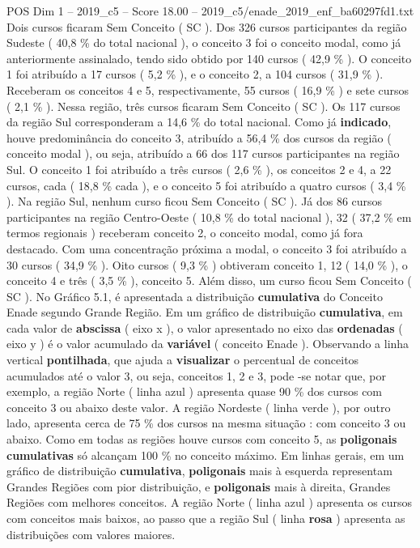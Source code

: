 \begin{textsample}{POS Dim 1 – 2019\_c5 – Score 18.00 – 2019\_c5/enade\_2019\_enf\_ba60297fd1.txt}
Dois cursos ficaram Sem Conceito ( SC ).
Dos 326 cursos participantes da região Sudeste ( 40,8 \% do total nacional ), o conceito 3 foi o conceito modal, como já anteriormente assinalado, tendo sido obtido por 140 cursos ( 42,9 \% ).
O conceito 1 foi atribuído a 17 cursos ( 5,2 \% ), e o conceito 2, a 104 cursos ( 31,9 \% ).
Receberam os conceitos 4 e 5, respectivamente, 55 cursos ( 16,9 \% ) e sete cursos ( 2,1 \% ).
Nessa região, três cursos ficaram Sem Conceito ( SC ).
Os 117 cursos da região Sul corresponderam a 14,6 \% do total nacional.
Como já \textbf{indicado}, houve predominância do conceito 3, atribuído a 56,4 \% dos cursos da região ( conceito modal ), ou seja, atribuído a 66 dos 117 cursos participantes na região Sul.
O conceito 1 foi atribuído a três cursos ( 2,6 \% ), os conceitos 2 e 4, a 22 cursos, cada ( 18,8 \% cada ), e o conceito 5 foi atribuído a quatro cursos ( 3,4 \% ).
Na região Sul, nenhum curso ficou Sem Conceito ( SC ).
Já dos 86 cursos participantes na região Centro-Oeste ( 10,8 \% do total nacional ), 32 ( 37,2 \% em termos regionais ) receberam conceito 2, o conceito modal, como já fora destacado.
Com uma concentração próxima a modal, o conceito 3 foi atribuído a 30 cursos ( 34,9 \% ).
Oito cursos ( 9,3 \% ) obtiveram conceito 1, 12 ( 14,0 \% ), o conceito 4 e três ( 3,5 \% ), conceito 5.
Além disso, um curso ficou Sem Conceito ( SC ).
No Gráfico 5.1, é apresentada a distribuição \textbf{cumulativa} do Conceito Enade segundo Grande Região.
Em um gráfico de distribuição \textbf{cumulativa}, em cada valor de \textbf{abscissa} ( eixo x ), o valor apresentado no eixo das \textbf{ordenadas} ( eixo y ) é o valor acumulado da \textbf{variável} ( conceito Enade ).
Observando a linha vertical \textbf{pontilhada}, que ajuda a \textbf{visualizar} o percentual de conceitos acumulados até o valor 3, ou seja, conceitos 1, 2 e 3, pode -se notar que, por exemplo, a região Norte ( linha azul ) apresenta quase 90 \% dos cursos com conceito 3 ou abaixo deste valor.
A região Nordeste ( linha verde ), por outro lado, apresenta cerca de 75 \% dos cursos na mesma situação : com conceito 3 ou abaixo.
Como em todas as regiões houve cursos com conceito 5, as \textbf{poligonais} \textbf{cumulativas} só alcançam 100 \% no conceito máximo.
Em linhas gerais, em um gráfico de distribuição \textbf{cumulativa}, \textbf{poligonais} mais à esquerda representam Grandes Regiões com pior distribuição, e \textbf{poligonais} mais à direita, Grandes Regiões com melhores conceitos.
A região Norte ( linha azul ) apresenta os cursos com conceitos mais baixos, ao passo que a região Sul ( linha \textbf{rosa} ) apresenta as distribuições com valores maiores.

\end{textsample}
